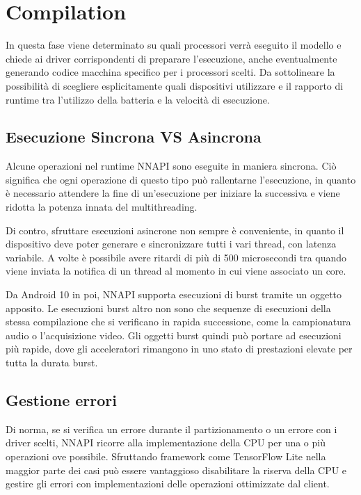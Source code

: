 \section{Compilation}
In questa fase viene determinato su quali processori verrà eseguito il modello e chiede ai driver corrispondenti di preparare l’esecuzione, anche eventualmente generando codice macchina specifico per i processori scelti.
Da sottolineare la possibilità di scegliere esplicitamente quali dispositivi utilizzare e il rapporto di runtime tra l’utilizzo della batteria e la velocità di esecuzione.

\subsection{Esecuzione Sincrona VS Asincrona}
Alcune operazioni nel runtime NNAPI sono eseguite in maniera sincrona. Ciò significa che ogni operazione di questo tipo può rallentarne l’esecuzione, in quanto è necessario attendere la fine di un’esecuzione per iniziare
la successiva e viene ridotta la potenza innata del multithreading.

Di contro, sfruttare esecuzioni asincrone non sempre è conveniente, in quanto il dispositivo deve poter generare e sincronizzare tutti i vari thread, con latenza variabile. A volte è possibile avere ritardi di più di
500 microsecondi tra quando viene inviata la notifica di un thread al momento in cui viene associato un core. 

Da Android 10 in poi, NNAPI supporta esecuzioni di burst tramite un oggetto apposito. Le esecuzioni burst altro non sono che sequenze di esecuzioni della stessa compilazione che si verificano in rapida successione,
come la campionatura audio o l’acquisizione video. Gli oggetti burst quindi può portare ad esecuzioni più rapide, dove gli acceleratori rimangono in uno stato di prestazioni elevate per tutta la durata burst.

\subsection{Gestione errori}
Di norma, se si verifica un errore durante il partizionamento o un errore con i driver scelti, NNAPI ricorre alla implementazione della CPU per una o più operazioni ove possibile. Sfruttando framework come TensorFlow Lite
nella maggior parte dei casi può essere vantaggioso disabilitare la riserva della CPU e gestire gli errori con implementazioni delle operazioni ottimizzate dal client.

